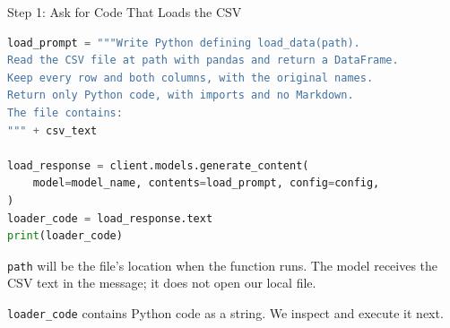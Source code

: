 \documentclass[aspectratio=169]{beamer}
\begin{document}
\begin{frame}[fragile]{Step 1: Ask for Code That Loads the CSV}
\begin{lstlisting}[language=Python,commentstyle=\ttfamily\color{AMU_dk1}]
load_prompt = """Write Python defining load_data(path).
Read the CSV file at path with pandas and return a DataFrame.
Keep every row and both columns, with the original names.
Return only Python code, with imports and no Markdown.
The file contains:
""" + csv_text

load_response = client.models.generate_content(
    model=model_name, contents=load_prompt, config=config,
)
loader_code = load_response.text
print(loader_code)
\end{lstlisting}
  \small \texttt{path} will be the file's location when the function runs. The model receives the CSV text in the message; it does not open our local file.
  \par\vspace{0.4em}
  \texttt{loader\_code} contains Python code as a string. We inspect and execute it next.
\end{frame}
\end{document}
